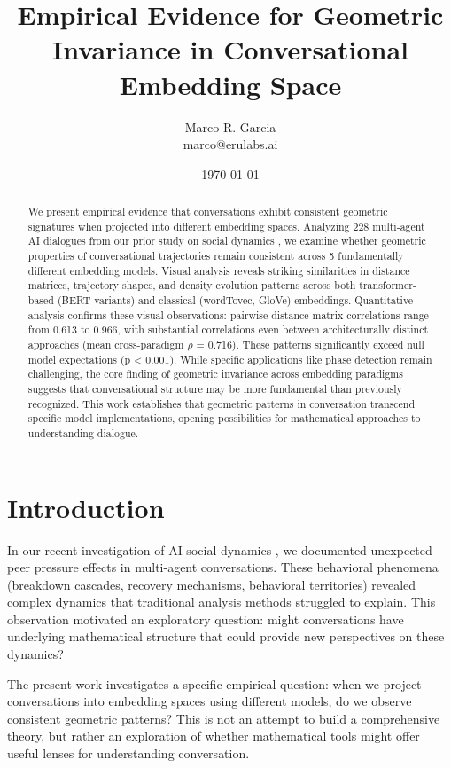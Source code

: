 \documentclass[11pt,letterpaper]{article}
\title{Empirical Evidence for Geometric Invariance in Conversational Embedding Space}
\author{
Marco R. Garcia \\
marco@erulabs.ai
}
\date{\today}
\newcommand{\totalConversations}{228}
\newcommand{\numEmbeddingModels}{5}
\newcommand{\minPairwiseCorr}{0.613}
\newcommand{\maxPairwiseCorr}{0.966}
\newcommand{\crossParadigmCorr}{0.716}
\newcommand{\nullModelPValue}{0.001}
\begin{document}
\maketitle

\begin{abstract}
We present empirical evidence that conversations exhibit consistent geometric signatures when projected into different embedding spaces. Analyzing \totalConversations{} multi-agent AI dialogues from our prior study on social dynamics \citep{garcia2025peer}, we examine whether geometric properties of conversational trajectories remain consistent across \numEmbeddingModels{} fundamentally different embedding models. Visual analysis reveals striking similarities in distance matrices, trajectory shapes, and density evolution patterns across both transformer-based (BERT variants) and classical (wordTovec, GloVe) embeddings. Quantitative analysis confirms these visual observations: pairwise distance matrix correlations range from \minPairwiseCorr{} to \maxPairwiseCorr{}, with substantial correlations even between architecturally distinct approaches (mean cross-paradigm $\rho$ = \crossParadigmCorr{}). These patterns significantly exceed null model expectations (p < \nullModelPValue{}). While specific applications like phase detection remain challenging, the core finding of geometric invariance across embedding paradigms suggests that conversational structure may be more fundamental than previously recognized. This work establishes that geometric patterns in conversation transcend specific model implementations, opening possibilities for mathematical approaches to understanding dialogue.
\end{abstract}

\section{Introduction}

In our recent investigation of AI social dynamics \citep{garcia2025peer}, we documented unexpected peer pressure effects in multi-agent conversations. These behavioral phenomena (breakdown cascades, recovery mechanisms, behavioral territories) revealed complex dynamics that traditional analysis methods struggled to explain. This observation motivated an exploratory question: might conversations have underlying mathematical structure that could provide new perspectives on these dynamics?

The present work investigates a specific empirical question: when we project conversations into embedding spaces using different models, do we observe consistent geometric patterns? This is not an attempt to build a comprehensive theory, but rather an exploration of whether mathematical tools might offer useful lenses for understanding conversation.
\end{document}
